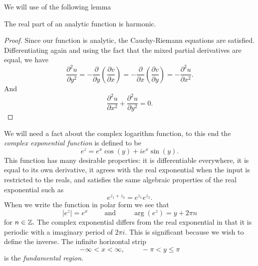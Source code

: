 We will use of the following lemma
\begin{lemma}\label{lem:anal-harmonic}
	The real part of an analytic function is harmonic.
\end{lemma}
\begin{proof}
	Since our function is analytic, the Cauchy-Riemann equations are satisfied.
	Differentiating again and using the fact that the mixed partial derivatives are equal,
	we have
	$$\frac{\partial^2 u}{\partial y^2}=-\frac{\partial}{\partial y}\left(\frac{\partial v}{\partial x}\right)
	=-\frac{\partial}{\partial x}\left(\frac{\partial v}{\partial y}\right)=-\frac{\partial^2 u}{\partial x^2}.$$
	And $$\frac{\partial^2 u}{\partial x^2}+\frac{\partial^2 u}{\partial y^2}=0.$$
\end{proof}

We will need a fact about the complex logarithm function, to this end the 
\emph{complex exponential function} is defined to be
$$e^z=e^x\cos(y)+ie^x\sin(y).$$
This function has many desirable properties: it is differentiable everywhere,
it is equal to its own derivative, it agrees with the real exponential when the
input is restricted to the reals, and satisfies the same algebraic properties
of the real exponential such as $$e^{z_1+z_2}=e^{z_1}e^{z_2}.$$
When we write the function in polar form we see that
$$|e^z|=e^x\hspace{1cm} \textrm{and} \hspace{1cm} \arg(e^z)=y+2\pi n$$
for $n\in \mathbb{Z}.$
The complex exponential differs from the real exponential in that 
it is periodic with a imaginary period of $2\pi i.$ This is significant because
we wish to define the inverse. The infinite horizontal
strip $$-\infty<x<\infty, \hspace{1cm} -\pi< y\leq \pi$$ is the \emph{fundamental region}.

